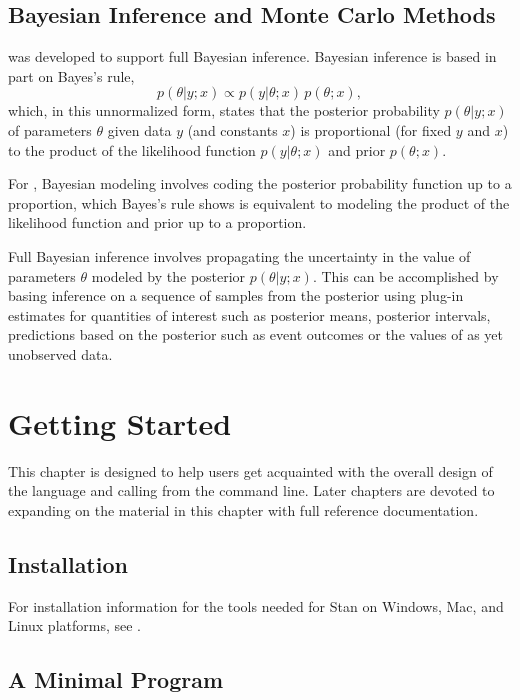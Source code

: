 \section{Bayesian Inference and Monte Carlo Methods}

\Stan was developed to support full Bayesian inference.  Bayesian
inference is based in part on Bayes's rule,
\[
p(\theta|y;x) \propto p(y|\theta;x) \, p(\theta;x),
\]
which, in this unnormalized form, states that the posterior
probability $p(\theta|y;x)$ of parameters $\theta$ given data $y$ (and
constants $x$) is proportional (for fixed $y$ and $x$) to the
product of the likelihood function $p(y|\theta;x)$ and prior
$p(\theta;x)$.

For \Stan, Bayesian modeling involves coding the posterior probability
function up to a proportion, which Bayes's rule shows is equivalent to
modeling the product of the likelihood function and prior up to a
proportion.

Full Bayesian inference involves propagating the uncertainty in the
value of parameters $\theta$ modeled by the posterior $p(\theta|y;x)$.
This can be accomplished by basing inference on a sequence of samples
from the posterior using plug-in estimates for quantities of interest
such as posterior means, posterior intervals, predictions based on the
posterior such as event outcomes or the values of as yet unobserved
data.



\chapter{Getting Started}

\noindent
This chapter is designed to help users get acquainted with the overall
design of the \Stan language and calling \Stan from the command line.
Later chapters are devoted to expanding on the material in this
chapter with full reference documentation.

\section{Installation}

For installation information for the tools needed for Stan on Windows,
Mac, and Linux platforms, see .


\section{A Minimal Program}

